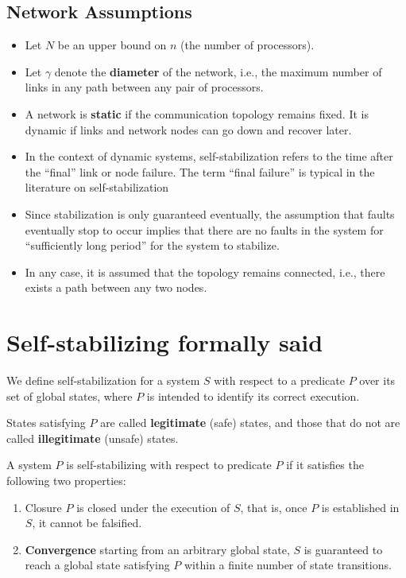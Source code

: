 \subsection{Network Assumptions}
\begin{itemize}
   \item Let $N$ be an upper bound on $n$ (the number of processors).
   \item Let $\gamma$ denote the \textbf{diameter} of the network, i.e., the maximum number of links in any path between any pair of processors.
   \item A network is \textbf{static} if the communication topology remains fixed. It is dynamic if links and network nodes can go down and recover later.
   \item In the context of dynamic systems, self-stabilization refers to the time after the “final” link or node failure. The
   term “final failure” is typical in the literature on self-stabilization
   \item Since stabilization is only guaranteed eventually, the assumption that faults eventually stop to occur implies
   that there are no faults in the system for “sufficiently long period” for the system to stabilize.
   \item In any case, it is assumed that the topology remains connected, i.e., there exists a path between any two
   nodes.
\end{itemize}

\section{Self-stabilizing formally said}
We define self-stabilization for a system $S$ with respect to a predicate $P$ over its set of global states, where $P$ is intended to identify its correct execution.

States satisfying $P$ are called \textbf{legitimate} (safe) states, and those that do not are called \textbf{illegitimate} (unsafe) states.

A system $P$ is self-stabilizing with respect to predicate $P$ if it satisfies the following two properties:

\begin{enumerate}
	\item Closure $P$ is closed under the execution of $S$, that is, once $P$ is established in $S$, it cannot be falsified.
	\item \textbf{Convergence} starting from an arbitrary global state, $S$ is guaranteed to reach a global state satisfying $P$ within a finite number of state transitions.

\end{enumerate}

